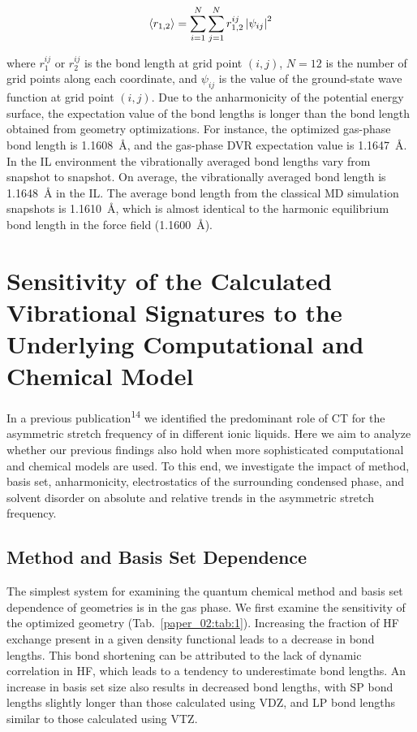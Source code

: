 \begin{equation}
  \label{paper_02:eq:3}
  \Braket{ r_{1,2} } = \sum_{i = 1}^{N} \sum_{j = 1}^{N} r_{1,2}^{ij}\left| \psi_{ij} \right|^{2}
\end{equation}

where \(r_{1}^{ij}\) or \(r_{2}^{ij}\) is the bond length at grid point \((i,j)\), \(N = 12\) is the number of grid points along each coordinate, and \(\psi_{ij}\) is the value of the ground-state wave function at grid point \((i,j)\). Due to the anharmonicity of the potential energy surface, the expectation value of the bond lengths is longer than the bond length obtained from geometry optimizations. For instance, the optimized gas-phase bond length is \SI{1.1608}{\angstrom}, and the gas-phase DVR expectation value is \SI{1.1647}{\angstrom}. In the IL environment the vibrationally averaged  bond lengths vary from snapshot to snapshot. On average, the vibrationally averaged  bond length is \SI{1.1648}{\angstrom} in the IL. The average bond length from the classical MD simulation snapshots is \SI{1.1610}{\angstrom}, which is almost identical to the harmonic equilibrium bond length in the force field (\SI{1.1600}{\angstrom}).

\section{Sensitivity of the Calculated Vibrational Signatures to the Underlying Computational and Chemical Model}
\label{paper_02:sec:III}

In a previous publication\textsuperscript{14} we identified the predominant role of CT for the asymmetric stretch frequency of  in different ionic liquids. Here we aim to analyze whether our previous findings also hold when more sophisticated computational and chemical models are used. To this end, we investigate the impact of method, basis set, anharmonicity, electrostatics of the surrounding condensed phase, and solvent disorder on absolute and relative trends in the  asymmetric stretch frequency.

\subsection{Method and Basis Set Dependence}
\label{paper_02:ssec:IIIA}

The simplest system for examining the quantum chemical method and basis set dependence of geometries is  in the gas phase. We first examine the sensitivity of the optimized geometry (Tab.~\ref{paper_02:tab:1}). Increasing the fraction of HF exchange present in a given density functional leads to a decrease in bond lengths. This bond shortening can be attributed to the lack of dynamic correlation in HF, which leads to a tendency to underestimate bond lengths. An increase in basis set size also results in decreased bond lengths, with SP bond lengths slightly longer than those calculated using VDZ, and LP bond lengths similar to those calculated using VTZ.

